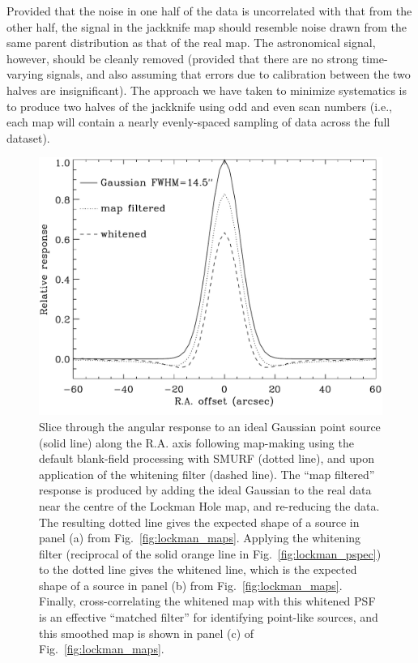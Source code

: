 \documentclass[useAMS,usenatbib,nofootinbib]{mn2e}
\begin{document}
Provided that the noise in one half of the data is uncorrelated with
that from the other half, the signal in the jackknife map should
resemble noise drawn from the same parent distribution as that of the
real map. The astronomical signal, however, should be cleanly removed
(provided that there are no strong time-varying signals, and also
assuming that errors due to calibration between the two halves are
insignificant). The approach we have taken to minimize systematics is
to produce two halves of the jackknife using odd and even scan numbers
(i.e., each map will contain a nearly evenly-spaced sampling of data
across the full dataset).


\begin{figure}
\centering
\includegraphics[width=\linewidth]{lockman_psf.pdf}
\caption{Slice through the angular response to an ideal Gaussian point
  source (solid line) along the R.A. axis following map-making using
  the default blank-field processing with SMURF (dotted line), and
  upon application of the whitening filter (dashed line). The ``map
  filtered'' response is produced by adding the ideal Gaussian to the
  real data near the centre of the Lockman Hole map, and re-reducing
  the data. The resulting dotted line gives the expected shape of a
  source in panel (a) from Fig.~\ref{fig:lockman_maps}. Applying the
  whitening filter (reciprocal of the solid orange line in
  Fig.~\ref{fig:lockman_pspec}) to the dotted line gives the whitened
  line, which is the expected shape of a source in panel (b) from
  Fig.~\ref{fig:lockman_maps}. Finally, cross-correlating the whitened
  map with this whitened PSF is an effective ``matched filter'' for
  identifying point-like sources, and this smoothed map is shown in
  panel (c) of Fig.~\ref{fig:lockman_maps}.}
\label{fig:lockman_psf}
\end{figure}
\end{document}
